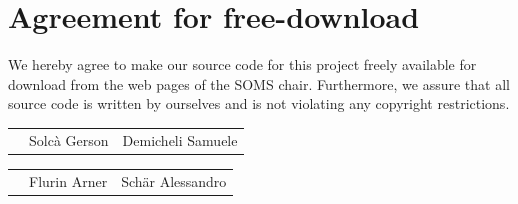 \documentclass[11pt]{article}
\begin{document}

\newpage


\newpage
\section*{Agreement for free-download}
\bigskip


\bigskip


\large We hereby agree to make our source code for this project freely available for download from the web pages of the SOMS chair. Furthermore, we assure that all source code is written by ourselves and is not violating any copyright restrictions.

\begin{center}

\bigskip


\bigskip


\begin{tabular}{@{}p{3.3cm}@{}p{6cm}@{}@{}p{6cm}@{}}
\begin{minipage}{3cm}

\end{minipage}
&
\begin{minipage}{6cm}
\vspace{4mm} \large Solcà Gerson

 \vspace{\baselineskip}

\end{minipage}
&
\begin{minipage}{6cm}

\large  Demicheli Samuele

\end{minipage}

\end{tabular}

\begin{tabular}{@{}p{3.3cm}@{}p{6cm}@{}@{}p{6cm}@{}}
\begin{minipage}{3cm}

\end{minipage}
&
\begin{minipage}{6cm}
\vspace{4mm} \large Flurin Arner

 \vspace{\baselineskip}

\end{minipage}
&
\begin{minipage}{6cm}

\large Schär Alessandro

\end{minipage}

\end{tabular}

\end{center}
\newpage
\end{document}
